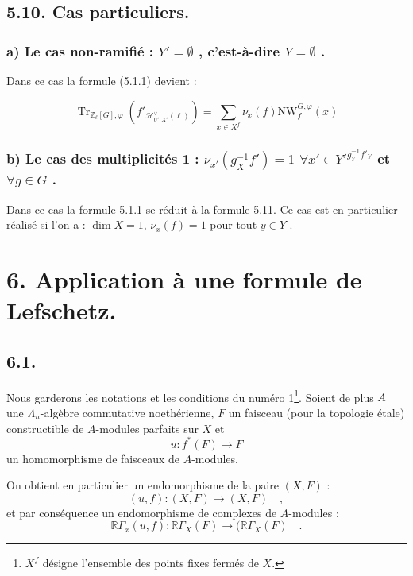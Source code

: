 \documentclass[11pt]{article}
\newcommand{\R}{\mathbb{R}}\newcommand{\RHomCore}{\mathbb{R}\mathrm{Hom}}
\providecommand{\Tr}{\operatorname{Tr}}
\providecommand{\Tr}{\operatorname{Tr}}
\providecommand{\Tr}{\operatorname{Tr}}
\providecommand{\R}{\mathrm R}
\providecommand{\Tr}{\operatorname{Tr}}
\providecommand{\La}{\Lambda}
\providecommand{\bZ}{\mathbb Z}
\providecommand{\Tr}{\operatorname{Tr}}
\begin{document}
\subsection*{5.10. Cas particuliers.}
\subsubsection*{a) Le cas non-ramifié : $Y' = \emptyset$ , c'est-à-dire $Y = \emptyset$ .}

Dans ce cas la formule (5.1.1) devient :

\begin{equation}\tag{5.11}
\Tr_{\bZ_\ell[G],\varphi}(f'_{\mathcal{H}^\vee_{U',X'}(\ell)}) = \sum_{x \in X^f} \nu_x(f) \mathrm{NW}_f^{G,\varphi}(x)
\end{equation}

\subsubsection*{b) Le cas des multiplicités 1 : $\nu_{x'}(g_{X}^{-1}f') = 1$ $\forall x'\in {Y'}^{g_{Y}^{-1}f'_{Y}}$ et $\forall g\in G$ .}

Dans ce cas la formule 5.1.1 se réduit à la formule 5.11. Ce cas est en particulier réalisé si l'on a : $\dim X = 1$, $\nu_x(f)=1$ pour tout $y\in Y$ .%

\section*{6. Application à une formule de Lefschetz.}

\subsection*{6.1.}
Nous garderons les notations et les conditions du numéro 1\footnote{$X^f$ désigne l'ensemble des points fixes fermés de $X$.}. Soient de plus $A$ une $\La_n$-algèbre commutative noethérienne, $F$ un faisceau (pour la topologie étale) constructible de $A$-modules parfaits sur $X$ et
\[
u : f^*(F) \longrightarrow F
\]
un homomorphisme de faisceaux de $A$-modules.

On obtient en particulier un endomorphisme de la paire $(X, F)$ :
\[
(u, f) : (X, F) \longrightarrow (X, F) \quad ,
\]
et par conséquence un endomorphisme de complexes de $A$-modules :
\[
\R\Gamma_x(u, f) : \R\Gamma_X(F) \longrightarrow (\R\Gamma_X(F) \quad .
\]
\end{document}
